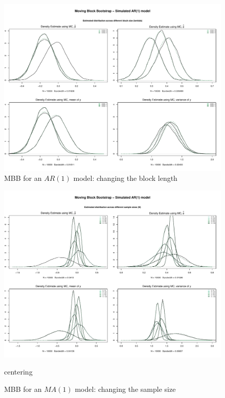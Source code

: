 \documentclass{article}
\begin{document}
\begin{figure}[hbt!]
\includegraphics[width=\textwidth]{plots/MBB_AR1_densities_diff_blocklength}
\caption{MBB for an $AR(1)$ model: changing the block length}
\label{fig:MBB_AR1_densities_diff_blocklength}
\centering
\end{figure}


\clearpage
\begin{figure}[hbt!]
\includegraphics[width=\textwidth]{plots/MBB_AR1_densities_diff_smpl}
\caption{MBB for an $MA(1)$ model: changing the sample size}
\label{fig:MBB_MA1_densities_diff_smpl}
centering
\end{figure}
\end{document}
